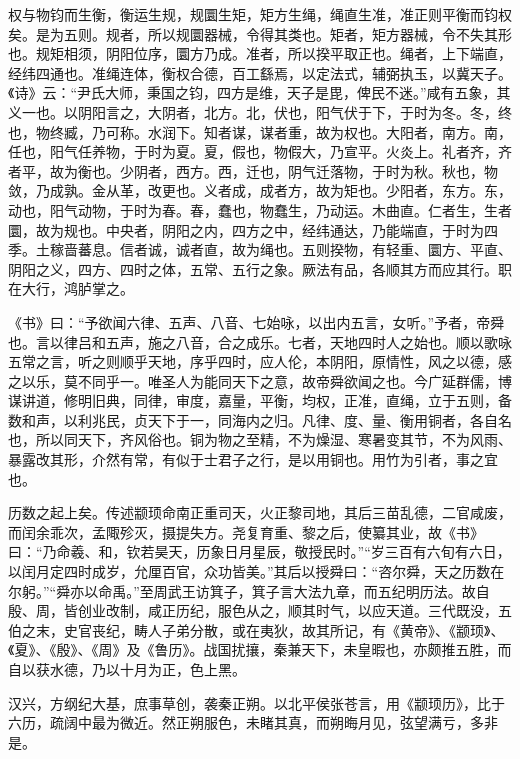 \documentclass[12pt,UTF8]{ctexbook}
\begin{document}
权与物钧而生衡，衡运生规，规圜生矩，矩方生绳，绳直生准，准正则平衡而钧权矣。是为五则。规者，所以规圜器械，令得其类也。矩者，矩方器械，令不失其形也。规矩相须，阴阳位序，圜方乃成。准者，所以揆平取正也。绳者，上下端直，经纬四通也。准绳连体，衡权合德，百工繇焉，以定法式，辅弼执玉，以冀天子。《诗》云：“尹氏大师，秉国之钧，四方是维，天子是毘，俾民不迷。”咸有五象，其义一也。以阴阳言之，大阴者，北方。北，伏也，阳气伏于下，于时为冬。冬，终也，物终臧，乃可称。水润下。知者谋，谋者重，故为权也。大阳者，南方。南，任也，阳气任养物，于时为夏。夏，假也，物假大，乃宣平。火炎上。礼者齐，齐者平，故为衡也。少阴者，西方。西，迁也，阴气迁落物，于时为秋。秋也，物敛，乃成孰。金从革，改更也。义者成，成者方，故为矩也。少阳者，东方。东，动也，阳气动物，于时为春。春，蠢也，物蠢生，乃动运。木曲直。仁者生，生者圜，故为规也。中央者，阴阳之内，四方之中，经纬通达，乃能端直，于时为四季。土稼啬蕃息。信者诚，诚者直，故为绳也。五则揆物，有轻重、圜方、平直、阴阳之义，四方、四时之体，五常、五行之象。厥法有品，各顺其方而应其行。职在大行，鸿胪掌之。



《书》曰：“予欲闻六律、五声、八音、七始咏，以出内五言，女听。”予者，帝舜也。言以律吕和五声，施之八音，合之成乐。七者，天地四时人之始也。顺以歌咏五常之言，听之则顺乎天地，序乎四时，应人伦，本阴阳，原情性，风之以德，感之以乐，莫不同乎一。唯圣人为能同天下之意，故帝舜欲闻之也。今广延群儒，博谋讲道，修明旧典，同律，审度，嘉量，平衡，均权，正准，直绳，立于五则，备数和声，以利兆民，贞天下于一，同海内之归。凡律、度、量、衡用铜者，各自名也，所以同天下，齐风俗也。铜为物之至精，不为燥湿、寒暑变其节，不为风雨、暴露改其形，介然有常，有似于士君子之行，是以用铜也。用竹为引者，事之宜也。



历数之起上矣。传述颛顼命南正重司天，火正黎司地，其后三苗乱德，二官咸废，而闰余乖次，孟陬殄灭，摄提失方。尧复育重、黎之后，使纂其业，故《书》曰：“乃命羲、和，钦若昊天，历象日月星辰，敬授民时。”“岁三百有六旬有六日，以闰月定四时成岁，允厘百官，众功皆美。”其后以授舜曰：“咨尔舜，天之历数在尔躬。”“舜亦以命禹。”至周武王访箕子，箕子言大法九章，而五纪明历法。故自殷、周，皆创业改制，咸正历纪，服色从之，顺其时气，以应天道。三代既没，五伯之末，史官丧纪，畴人子弟分散，或在夷狄，故其所记，有《黄帝》、《颛顼》、《夏》、《殷》、《周》及《鲁历》。战国扰攘，秦兼天下，未皇暇也，亦颇推五胜，而自以获水德，乃以十月为正，色上黑。



汉兴，方纲纪大基，庶事草创，袭秦正朔。以北平侯张苍言，用《颛顼历》，比于六历，疏阔中最为微近。然正朔服色，未睹其真，而朔晦月见，弦望满亏，多非是。
\end{document}

